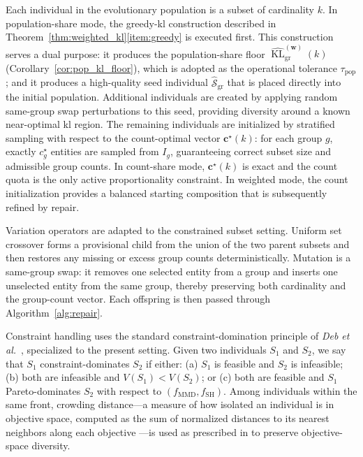 \documentclass[10pt,journal]{IEEEtran}
\newcommand{\1}{\mathbf{1}}
\newcommand{\bw}{\mathbf{w}}
\newcommand{\bc}{\mathbf{c}}
\newcommand{\Sel}{\mathcal{S}}
\DeclareMathOperator{\KL}{KL}
\theoremstyle{ieeethm}
\begin{document}
Each individual in the evolutionary population is a subset of cardinality $k$. In population-share mode, the greedy-\gls{kl} construction described in Theorem~\ref{thm:weighted_kl}\ref{item:greedy} is executed first. This construction serves a dual purpose: it produces the population-share floor $\widehat{\KL}^{(\bw)}_{\mathrm{gr}}(k)$ (Corollary~\ref{cor:pop_kl_floor}), which is adopted as the operational tolerance $\tau_{\mathrm{pop}}$; and it produces a high-quality seed individual $\widehat{\Sel}_{\mathrm{gr}}$ that is placed directly into the initial population. Additional individuals are created by applying random same-group swap perturbations to this seed, providing diversity around a known near-optimal \gls{kl} region. The remaining individuals are initialized by stratified sampling with respect to the count-optimal vector $\bc^\star(k)$: for each group $g$, exactly $c_g^\star$ entities are sampled from $I_g$, guaranteeing correct subset size and admissible group counts. In count-share mode, $\bc^\star(k)$ is exact and the count quota is the only active proportionality constraint. In weighted mode, the count initialization provides a balanced starting composition that is subsequently refined by repair.

Variation operators are adapted to the constrained subset setting. Uniform set crossover forms a provisional child from the union of the two parent subsets and then restores any missing or excess group counts deterministically. Mutation is a same-group swap: it removes one selected entity from a group and inserts one unselected entity from the same group, thereby preserving both cardinality and the group-count vector. Each offspring is then passed through Algorithm~\ref{alg:repair}.

Constraint handling uses the standard constraint-domination principle of \textit{Deb et al.}\ \cite{deb2002nsga2}, specialized to the present setting. Given two individuals $S_1$ and $S_2$, we say that $S_1$ constraint-dominates $S_2$ if either: (a) $S_1$ is feasible and $S_2$ is infeasible; (b) both are infeasible and $V(S_1)<V(S_2)$; or (c) both are feasible and $S_1$ Pareto-dominates $S_2$ with respect to $(f_{\mathrm{MMD}},f_{\mathrm{SH}})$. Among individuals within the same front, crowding distance---a measure of how isolated an individual is in objective space, computed as the sum of normalized distances to its nearest neighbors along each objective \cite{deb2002nsga2}---is used as prescribed in \cite{deb2002nsga2} to preserve objective-space diversity.
\end{document}

